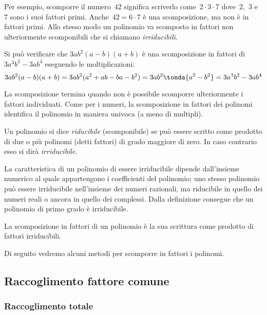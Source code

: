 Per esempio, scomporre il numero~\(42\) significa scriverlo 
come~\(2\cdot 3 \cdot 7\) dove~\(2\),~\(3\) e~\(7\) sono i suoi fattori primi.
Anche~\(42 = 6 \cdot 7\) è una scomposizione, ma non è in fattori primi. 
Allo stesso modo un polinomio va scomposto in fattori non ulteriormente
scomponibili che si chiamano \emph{irriducibili}. 

Si può verificare che \(3ab^{2}(a-b)(a+b)\) è una scomposizione in fattori di
\(3a^{3}b^{2}-3ab^{4}\) eseguendo le moltiplicazioni:
\[3ab^{2}(a-b)(a+b)=3ab^{2}(a^{2}+ab-ba-b^{2})=
  3ab^{2}\tonda{a^{2}-b^{2}}=3a^{3}b^{2}-3ab^{4}\]
  
La scomposizione termina quando non è possibile scomporre ulteriormente i 
fattori individuati.
Come per i numeri, la scomposizione in fattori dei polinomi identifica il 
polinomio in maniera univoca (a meno di multipli).

\begin{definizione}
Un polinomio si dice \emph{riducibile} (scomponibile) se può essere scritto 
come prodotto di due o più polinomi (detti fattori) di grado maggiore di zero.
In caso contrario esso si dirà \emph{irriducibile}.
\end{definizione}

La caratteristica di un polinomio di essere irriducibile dipende dall'insieme 
numerico al quale appartengono i coefficienti del polinomio;
uno stesso polinomio può essere irriducibile nell'insieme dei numeri 
razionali, ma riducibile in quello dei numeri reali o ancora in quello dei 
complessi.
Dalla definizione consegue che un polinomio di primo grado è irriducibile.

\begin{definizione}
La scomposizione in fattori di un polinomio è la sua scrittura come prodotto 
di fattori irriducibili.
\end{definizione}

Di seguito vedremo alcuni metodi per scomporre in fattori i polinomi.


\subsection{Raccoglimento fattore comune}
\label{subsec:divpol_fattorecomune}

\subsubsection{Raccoglimento totale}

